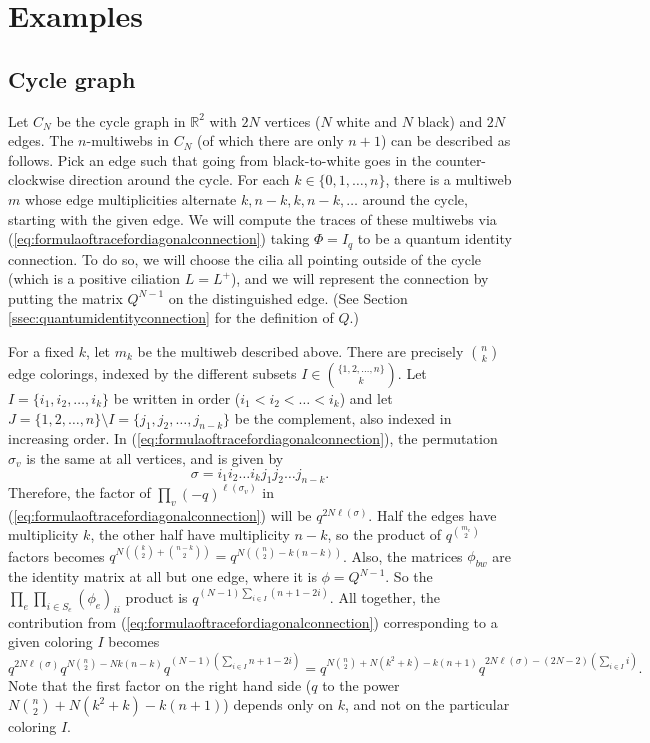 \documentclass[12pt, reqno]{amsart}
\theoremstyle{definition}
\newcommand{\R}{\mathbb{R}}%
\begin{document}
\section{Examples}
\label{sec:examples}

\subsection {Cycle graph}

Let $C_N$ be the cycle graph in $\R^2$ with $2N$ vertices ($N$ white and $N$ black) and $2N$ edges.  The $n$-multiwebs in $C_N$ (of which there are only $n+1$) can be described as follows. Pick an edge such that going from black-to-white goes in the counter-clockwise direction around the cycle. For each $k \in \{0,1,\dots,n\}$, there is a multiweb $m$ whose edge multiplicities alternate $k,n-k,k,n-k,\dots$ around the cycle, starting with the given edge.  We will compute the traces of these multiwebs via (\ref{eq:formulaoftracefordiagonalconnection}) taking $\Phi=I_q$ to be a quantum identity connection. To do so, we will choose the cilia all pointing outside of the cycle (which is a positive ciliation $L=L^+$), and we will represent the connection by putting the matrix $Q^{N-1}$ on the distinguished edge.  (See Section \ref{ssec:quantumidentityconnection} for the definition of $Q$.)

For a fixed $k$, let $m_k$ be the multiweb described above. There are precisely $\binom{n}{k}$ edge colorings, indexed by the different subsets $I \in \binom{\{1,2,\dots,n\}}{k}$. Let $I = \{i_1, i_2,\dots,i_k\}$ be written in order ($i_1 < i_2 < \dots < i_k$) and let $J = \{1,2,\dots,n\} \setminus I = \{j_1,j_2,\dots,j_{n-k}\}$ be the complement, also indexed in increasing order. In (\ref{eq:formulaoftracefordiagonalconnection}), the permutation $\sigma_v$ is the same at all vertices, and is given by 
$$ 
\sigma = i_1 i_2 \dots i_k j_1 j_2 \dots j_{n-k}. 
$$
Therefore, the factor of $\prod_v (-q)^{\ell(\sigma_v)}$ in (\ref{eq:formulaoftracefordiagonalconnection}) will be $q^{2N \ell(\sigma)}$. Half the edges have multiplicity $k$, the other half have multiplicity $n-k$, so the product of $q^{\binom{m_e}{2}}$ factors becomes  $q^{N( \binom{k}{2} + \binom{n-k}{2})} = q^{N ( \binom{n}{2} - k(n-k) )}$. Also, the matrices $\phi_{bw}$ are the identity matrix at all but one edge, where it is $\phi = Q^{N-1}$. So the $\prod_e \prod_{i \in S_e} (\phi_e)_{ii}$ product is $q^{( N - 1 )\sum_{i \in I} (n+1-2i)}$. All together, the contribution from (\ref{eq:formulaoftracefordiagonalconnection}) corresponding to a given coloring $I$ becomes
$$ 
q^{2N  \ell(\sigma)} q^{N\binom{n}{2}-Nk(n-k)} q^{( N-1 ) \left(\sum_{i \in I} n+1 - 2i\right)} 
= q^{N\binom{n}{2}+N(k^2+k) - k(n+1)} q^{2N  \ell(\sigma) - (2N-2)\left(\sum_{i \in I} i\right)}.  
$$
Note that the first factor on the right hand side ($q$ to the power $N\binom{n}{2}+N(k^2+k) - k(n+1)$) depends only on $k$, and not on the particular coloring $I$.
\end{document}
